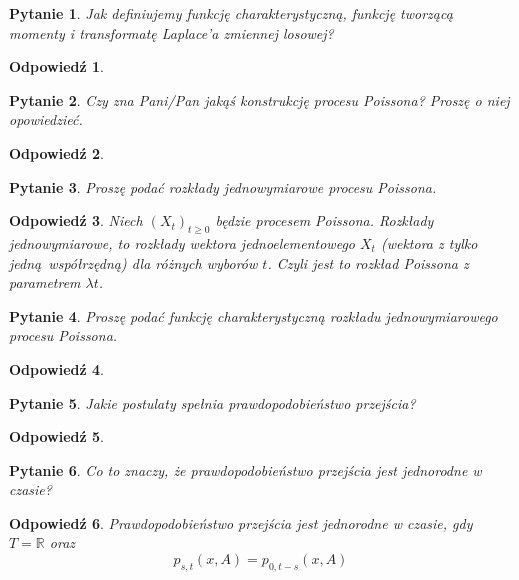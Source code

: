 \documentclass[12pt]{mwart}
\theoremstyle{plain}
\newtheorem{pytanie}{Pytanie}
\theoremstyle{break}
\newtheorem*{odpowiedź}{Odpowiedź}
\begin{document}
\begin{pytanie}
Jak definiujemy funkcję charakterystyczną, funkcję tworzącą momenty i transformatę Laplace'a zmiennej losowej?
\end{pytanie}
\begin{odpowiedź}
\end{odpowiedź}


\begin{pytanie}
Czy zna Pani/Pan jakąś konstrukcję procesu Poissona? Proszę o niej opowiedzieć.
\end{pytanie}
\begin{odpowiedź}
\end{odpowiedź}


\begin{pytanie}
Proszę podać rozkłady jednowymiarowe procesu Poissona.
\end{pytanie}
\begin{odpowiedź}
    Niech $(X_t)_{t\geq 0}$ będzie procesem Poissona.
    Rozkłady jednowymiarowe, to rozkłady wektora jednoelementowego
    $X_t$ (wektora z tylko jedną współrzędną) dla różnych wyborów $t$.
    Czyli jest to rozkład Poissona z parametrem $\lambda t$.
\end{odpowiedź}


\begin{pytanie}
Proszę podać funkcję charakterystyczną rozkładu jednowymiarowego procesu Poissona.
\end{pytanie}
\begin{odpowiedź}
\end{odpowiedź}


\begin{pytanie}
Jakie postulaty spełnia prawdopodobieństwo przejścia?
\end{pytanie}
\begin{odpowiedź}
\end{odpowiedź}


\begin{pytanie}
Co to znaczy, że prawdopodobieństwo przejścia jest jednorodne w czasie?
\end{pytanie}
\begin{odpowiedź}
    Prawdopodobieństwo przejścia jest jednorodne w czasie,
    gdy $T=\mathbb{R}$ oraz
    \[p_{s, t} (x,A) = p_{0, t-s} (x,A)\]
\end{odpowiedź}
\end{document}

